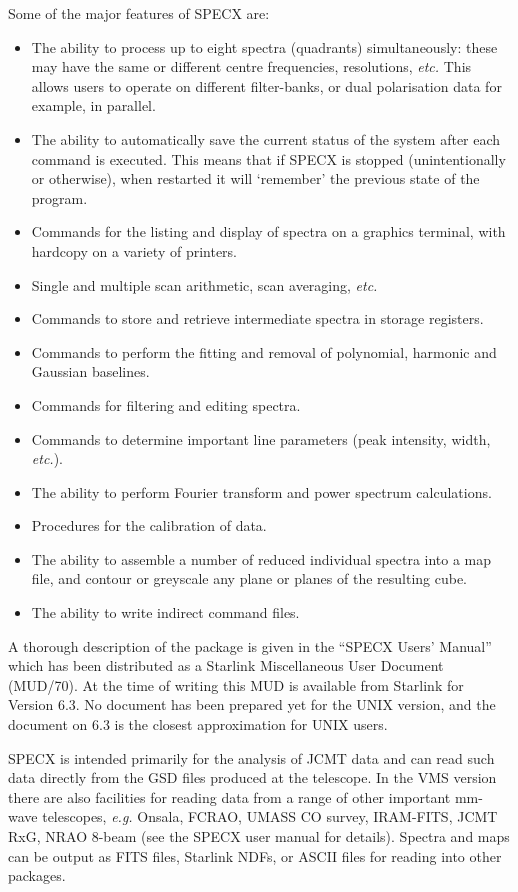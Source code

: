 \documentclass[twoside,11pt]{article}
\newcommand{\xref}[3]{#1}
\renewcommand{\_}{\texttt{\symbol{95}}}
\begin{document}
Some of the major features of SPECX are:
\begin{itemize}
\item
The ability to process up to eight spectra (quadrants) simultaneously:
these may have the same or different centre frequencies, resolutions, 
\emph{etc.} This allows users to operate on different filter-banks, or
dual polarisation data for example, in parallel. 
\item
The ability to automatically save the current status of the system 
after each command is executed. This means that if SPECX is
stopped (unintentionally or otherwise), when restarted it will
`remember' the previous state of the program.
\item
Commands for the listing and display of spectra on a graphics
terminal, with hardcopy on a variety of printers.
\item
Single and multiple scan arithmetic, scan averaging, \emph{etc.}
\item
Commands to store and retrieve intermediate spectra in storage registers.
\item
Commands to perform the fitting and removal of polynomial, 
harmonic and Gaussian baselines.
\item
Commands for filtering and editing spectra.
\item
Commands to determine important line parameters (peak intensity, width, 
\emph{etc.}).
\item
The ability to perform Fourier transform and power spectrum calculations.
\item
Procedures for the calibration of data.
\item
The ability to assemble a number of reduced individual spectra into a 
map file, and contour or greyscale any plane or planes of the resulting cube.
\item
The ability to write indirect command files.
\end{itemize}

A thorough description of the package is given in the ``SPECX Users' Manual''
which has been distributed as a Starlink Miscellaneous User Document
(MUD/70). At the time of writing this MUD is available from Starlink for
Version 6.3. No document has been prepared yet for the UNIX
version, and the document on 6.3 is the closest approximation for UNIX
users.

SPECX is intended primarily for the analysis of JCMT data and can read such
data directly from the \xref{GSD}{sun229}{} files produced at the telescope.  In the VMS
version there are also facilities for reading data from a range of other
important mm-wave telescopes, {\em e.g.} Onsala, FCRAO, UMASS CO survey,
IRAM-FITS, JCMT RxG, NRAO 8-beam (see the SPECX user manual for details).
Spectra and maps can be output as FITS files, Starlink NDFs, or ASCII files
for reading into other packages.
\end{document}
